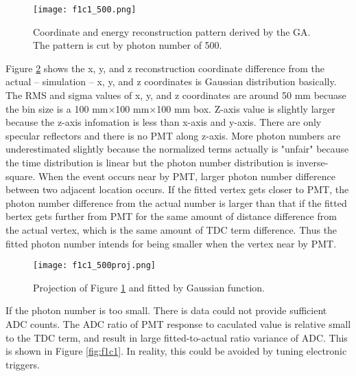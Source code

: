 
\begin{figure}
    \centering
    \texttt{[image: f1c1\_500.png]}
    \caption[Coordinate and energy reconstruction]
{
Coordinate and energy reconstruction pattern derived by the GA.
The pattern is cut by photon number of 500.
}
    \label{fig:f1c1_500.png}
    \end{figure}


Figure \ref{fig:f1c1_500proj.png} shows the x, y, and z reconstruction coordinate difference from the actual -- simulation --
x, y, and z coordinates is Gaussian distribution basically. The RMS and sigma values of x, y, and z coordinates are around 50 mm
becuase the bin size is a 100 mm$\times$100 mm$\times$100 mm box. Z-axis value is slightly larger because the z-axis infomation
is less than x-axis and y-axis. There are only specular reflectors and there is no PMT along z-axis.
More photon numbers are underestimated slightly because the normalized terms actually is "unfair" because the time distribution
is linear but the photon number distribution is inverse-square.
When the event occurs near by PMT,
larger photon number difference between two adjacent location occurs.
If the fitted vertex gets closer to PMT, the photon number difference from the actual number is larger than that
if the fitted bertex gets further from PMT for the same amount of distance difference from the actual vertex, which is the same
amount of TDC term difference. Thus the fitted photon number intends for being smaller when the vertex near by PMT.


\begin{figure}
    \centering
    \texttt{[image: f1c1\_500proj.png]}
    \caption[Projection of coordinate and energy reconstruction result in Figure \ref{fig:f1c1_500.png}]
{
Projection of Figure \ref{fig:f1c1_500.png} and fitted by Gaussian function.
}
    \label{fig:f1c1_500proj.png}
    \end{figure}



If the photon number is too small. There is data could not provide sufficient ADC counts.
The ADC ratio of PMT response to caculated value is relative small to the TDC term, and result in large
fitted-to-actual ratio variance of ADC. This is shown in Figure \ref{fig:f1c1}.
In reality, this could be avoided by tuning electronic triggers.



